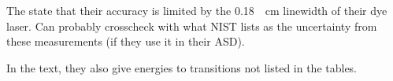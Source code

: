 \documentclass{article}
\begin{document}
\section{}

The state that their accuracy is limited by the \SI{0.18}{\per\cm} linewidth of their dye laser. Can probably crosscheck with what NIST lists as the uncertainty from these measurements (if they use it in their ASD).

In the text, they also give energies to transitions not listed in the tables.  

\printbibliography
\end{document}
